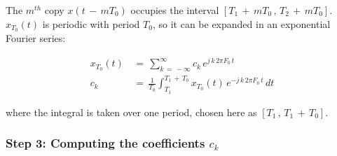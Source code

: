The $m^{th}$ copy $x(t \, - \, m T_0)$ occupies the interval $[T_1 \, + \, m T_0 \, , \, T_2 \, + \, m T_0]$.\\

$x_{T_0}(t)$ is periodic with period $T_0$, so it can be expanded in an exponential Fourier series:

\begin{align}
x_{T_0}(t) \, &= \, \sum_{k \, = \, -\infty}^{\infty} c_k \, e^{j \, k \, 2 \pi F_0 \, t}
\label{Eq:Sampling:spectral_periodic_FS} \\
c_k \, &= \, \frac{1}{T_0} \int_{T_1}^{T_1 \, + \, T_0} x_{T_0}(t) \, e^{-j \, k \, 2 \pi F_0 \, t} \, dt
\label{Eq:Sampling:spectral_ck_def}
\end{align}

where the integral is taken over one period, chosen here as $[T_1 \, , \, T_1 \, + \, T_0]$.

\subsubsection*{Step 3: Computing the coefficients $c_k$}

